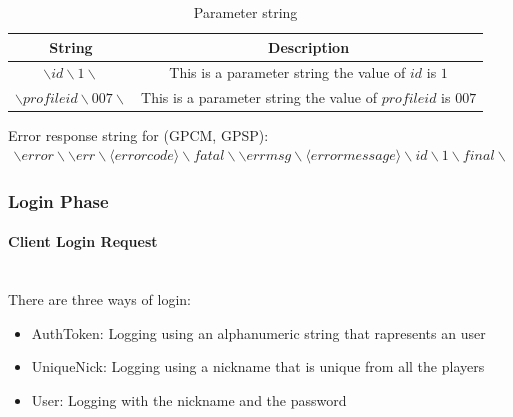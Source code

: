\documentclass[oneside,titlepage,a4paper]{report} %
\newcommand{\myparagraph}[1]{\paragraph{#1}\mbox{}\\}
\begin{document}
\begin{table}[H]
	\centering
	\begin{tabular}{|c|c|}
		\hline 
		String&Description  \\ 
		\hline 
		$ \backslash id \backslash 1 \backslash $& This is a parameter string the value of $ id $ is $ 1 $ \\ 		
		\hline 
		$ \backslash profileid \backslash 007 \backslash $ & This is a parameter string the value of $ profileid $ is $ 007 $ \\
		\hline
	\end{tabular} 
	\caption{Parameter string}
	\label{Parameter string}
\end{table}

Error response string for (GPCM, GPSP):
\begin{equation}
\begin{split}
\backslash error \backslash\backslash err \backslash \langle error code \rangle \backslash fatal\backslash\backslash errmsg \backslash \langle error message \rangle \backslash id\backslash 1 \backslash final \backslash
\end{split}	
\end{equation}
\subsubsection{Login Phase}
\myparagraph{Client Login Request}
There are three ways of login:
\begin{itemize}
	\item AuthToken: Logging using an alphanumeric string that rapresents an user
	\item 	UniqueNick: Logging using a nickname that is unique from all the players
	\item User: Logging with the nickname and the password
\end{itemize}
\end{document}

